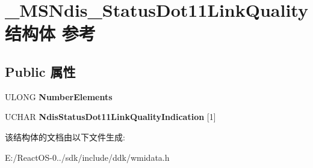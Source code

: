 \hypertarget{struct___m_s_ndis___status_dot11_link_quality}{}\section{\+\_\+\+M\+S\+Ndis\+\_\+\+Status\+Dot11\+Link\+Quality结构体 参考}
\label{struct___m_s_ndis___status_dot11_link_quality}
\subsection*{Public 属性}
\begin{DoxyCompactItemize}
\item 
\mbox{\label{struct___m_s_ndis___status_dot11_link_quality_a573037c5209b81f98623125f4352587d}} 
U\+L\+O\+NG {\bfseries Number\+Elements}
\item 
\mbox{\label{struct___m_s_ndis___status_dot11_link_quality_a44a34a24bd693e8435e51f05f19a387a}} 
U\+C\+H\+AR {\bfseries Ndis\+Status\+Dot11\+Link\+Quality\+Indication} \mbox{[}1\mbox{]}
\end{DoxyCompactItemize}


该结构体的文档由以下文件生成\+:\begin{DoxyCompactItemize}
\item 
E\+:/\+React\+O\+S-\/0../sdk/include/ddk/wmidata.\+h\end{DoxyCompactItemize}
